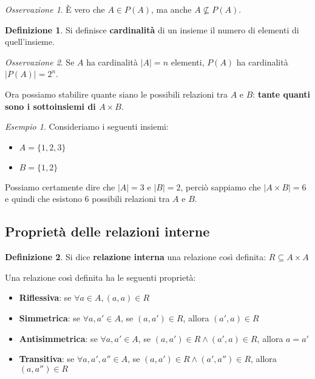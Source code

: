 \documentclass[a4paper, 12pt]{report}
\theoremstyle{definition}
\newtheorem{definition}{Definizione}[chapter]
\theoremstyle{remark}
\newtheorem{example}{Esempio}[definition]
\newtheorem{remark}{Osservazione}[definition]
\theoremstyle{plain}
\begin{document}
\begin{remark}
    È vero che $A \in P(A)$, ma anche $A \nsubseteq P(A)$.
\end{remark}

\begin{definition}
    Si definisce \textbf{cardinalità} di un insieme il numero di elementi di quell'insieme.
\end{definition}

\begin{remark}
    Se $A$ ha cardinalità $|A| = n$ elementi, $P(A)$ ha cardinalità $|P(A)| = 2^n$.
\end{remark}

Ora possiamo stabilire quante siano le possibili relazioni tra $A$ e $B$: \textbf{tante quanti sono i sottoinsiemi di $A \times B$}.

\begin{example}
    Consideriamo i seguenti insiemi:
    \begin{itemize}
        \item $A = \{1, 2, 3\}$
        \item $B = \{1, 2\}$
    \end{itemize}
    Possiamo certamente dire che $|A| = 3$ e $|B| = 2$, perciò sappiamo che $|A \times B| = 6$ e quindi che esistono 6 possibili relazioni tra $A$ e $B$.
\end{example}

\subsection{Proprietà delle relazioni interne}

\begin{definition}
    Si dice \textbf{relazione interna} una relazione così definita: $R \subseteq A \times A$
\end{definition}

Una relazione così definita ha le seguenti proprietà:
\begin{itemize}
    \item \textbf{Riflessiva}: se $\forall a \in A, (a, a) \in R$
    \item \textbf{Simmetrica}: se $\forall a, a' \in A$, se $(a, a') \in R$, allora $(a', a) \in R$
    \item \textbf{Antisimmetrica}: se $\forall a, a' \in A$, se $(a, a') \in R \land (a', a) \in R$, allora $a = a'$
    \item \textbf{Transitiva}: se $\forall a, a', a'' \in A$, se $(a, a') \in R \land (a', a'') \in R$, allora $(a, a'') \in R$
\end{itemize}
\end{document}
